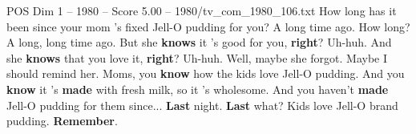 \begin{textsample}{POS Dim 1 – 1980 – Score 5.00 – 1980/tv\_com\_1980\_106.txt}  \label{ex:f1_pos_046}
How long has it been since your mom 's fixed Jell-O pudding for you?
A long time ago.
How long?
A long, long time ago.
But she \textbf{knows} it 's good for you, \textbf{right}?
Uh-huh.
And she \textbf{knows} that you love it, \textbf{right}?
Uh-huh.
Well, maybe she forgot.
Maybe I should remind her.
Moms, you \textbf{know} how the kids love Jell-O pudding.
And you \textbf{know} it 's \textbf{made} with fresh milk, so it 's wholesome.
And you haven't \textbf{made} Jell-O pudding for them since... \textbf{Last} night. \textbf{Last} what?
Kids love Jell-O brand pudding. \textbf{Remember}.

\end{textsample}
